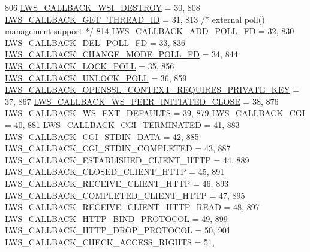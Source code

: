 \begin{DoxyCode}
806         \hyperlink{group__usercb_ggad62860e19975ba4c4af401c3cdb6abf7aca834dc035b7f7486f9ce40fde54fe9e}{LWS\_CALLBACK\_WSI\_DESTROY}                                = 30,
808         \hyperlink{group__usercb_ggad62860e19975ba4c4af401c3cdb6abf7adfb41c92e2522712207ef7f2462b5e34}{LWS\_CALLBACK\_GET\_THREAD\_ID}                            = 31,
813         \textcolor{comment}{/* external poll() management support */}
814         \hyperlink{group__usercb_ggad62860e19975ba4c4af401c3cdb6abf7ab69783a9fbf2ca71ad70706bda77b412}{LWS\_CALLBACK\_ADD\_POLL\_FD}                                = 32,
830         \hyperlink{group__usercb_ggad62860e19975ba4c4af401c3cdb6abf7a1df60f314710236f9b53efbf468da768}{LWS\_CALLBACK\_DEL\_POLL\_FD}                                = 33,
836         \hyperlink{group__usercb_ggad62860e19975ba4c4af401c3cdb6abf7aa87d2e82fffa42c3680c7403ef94216e}{LWS\_CALLBACK\_CHANGE\_MODE\_POLL\_FD}                        = 34,
844         \hyperlink{group__usercb_ggad62860e19975ba4c4af401c3cdb6abf7a8909732521d379179003d97ab7a05428}{LWS\_CALLBACK\_LOCK\_POLL}                                    = 35,
856         \hyperlink{group__usercb_ggad62860e19975ba4c4af401c3cdb6abf7a0e9e3dd667c0c42cdbe1a3d921f4fd79}{LWS\_CALLBACK\_UNLOCK\_POLL}                                = 36,
859         \hyperlink{group__usercb_ggad62860e19975ba4c4af401c3cdb6abf7aa46f705dcf97502e95627ffde614f98b}{LWS\_CALLBACK\_OPENSSL\_CONTEXT\_REQUIRES\_PRIVATE\_KEY}      
      = 37,
867         \hyperlink{group__usercb_ggad62860e19975ba4c4af401c3cdb6abf7ac3fc5bbb55e69f90396526287ee84a51}{LWS\_CALLBACK\_WS\_PEER\_INITIATED\_CLOSE}                        = 
      38,
876         LWS\_CALLBACK\_WS\_EXT\_DEFAULTS                            = 39,
879         LWS\_CALLBACK\_CGI                                        = 40,
881         LWS\_CALLBACK\_CGI\_TERMINATED                             = 41,
883         LWS\_CALLBACK\_CGI\_STDIN\_DATA                             = 42,
885         LWS\_CALLBACK\_CGI\_STDIN\_COMPLETED                        = 43,
887         LWS\_CALLBACK\_ESTABLISHED\_CLIENT\_HTTP                    = 44,
889         LWS\_CALLBACK\_CLOSED\_CLIENT\_HTTP                         = 45,
891         LWS\_CALLBACK\_RECEIVE\_CLIENT\_HTTP                        = 46,
893         LWS\_CALLBACK\_COMPLETED\_CLIENT\_HTTP                      = 47,
895         LWS\_CALLBACK\_RECEIVE\_CLIENT\_HTTP\_READ                   = 48,
897         LWS\_CALLBACK\_HTTP\_BIND\_PROTOCOL                         = 49,
899         LWS\_CALLBACK\_HTTP\_DROP\_PROTOCOL                         = 50,
901         LWS\_CALLBACK\_CHECK\_ACCESS\_RIGHTS                        = 51,

\end{DoxyCode}
